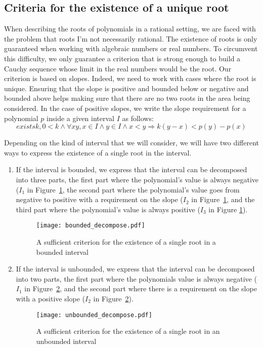 \documentclass{mscs}
\begin{document}
\subsection{Criteria for the existence of a unique root}
When describing the roots of polynomials in a rational setting, we are
faced with the problem that roots I'm not necessarily rational. The
existence of roots is only guaranteed when working with algebraic
numbers or real numbers. To circumvent this difficulty, we only
guarantee a criterion that is strong enough to build a Cauchy sequence
whose limit in the real numbers would be the root. Our criterion is
based on slopes. Indeed, we need to work with cases where the root is
unique. Ensuring that the slope is positive and bounded below or
negative and bounded above helps making sure that there are no two
roots in the area being considered. In the case of positive slopes, we
write the slope requirement for a polynomial \(p\) inside a given interval
\(I\) as follows:
\[exists k, 0 < k \wedge \forall x y, x \in I \wedge y \in I
\wedge x < y \Rightarrow k(y - x) < p(y) - p (x) \]

Depending on the kind of interval that we will consider, we will have
two different ways to express the existence of a single root in the
interval.

\begin{enumerate}
\item If the interval is bounded, we express that the interval can be
  decomposed into three parts, the first part where the polynomial's
  value is always negative (\(I_1\) in Figure~\ref{bounded_decompose}, the second part where the polynomial's
  value goes from negative to positive with a requirement on the
  slope (\(I_2\) in Figure~\ref{bounded_decompose}, and the third part where the polynomial's value is always
  positive (\(I_3\) in Figure \ref{bounded_decompose}).
\begin{figure}\label{bounded_decompose}
\begin{center}
\texttt{[image: bounded\_decompose.pdf]}
\end{center}
\caption{A sufficient criterion for the existence of a single root in a bounded interval}
\end{figure}
\item If the interval is unbounded, we express that the interval can
  be decomposed into two parts, the first part where the polynomials
  value is always negative (\(I_1\) in
  Figure~\ref{unbounded_decompose}, and the second part where there is
  a requirement on the slope with a positive slope (\(I_2\) in
  Figure~\ref{unbounded_decompose}).
\begin{figure}\label{unbounded_decompose}
\begin{center}
\texttt{[image: unbounded\_decompose.pdf]}
\end{center}
\caption{A sufficient criterion for the existence of a single root in an unbounded interval}
\end{figure}
\end{enumerate}
\end{document}
